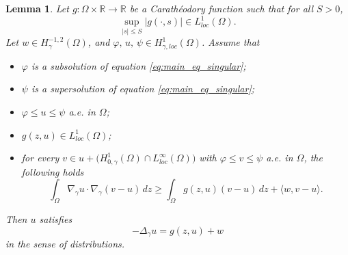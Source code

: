 \documentclass[10pt,a4paper]{amsart}
\newtheorem{lemma}{Lemma}
\newcommand{\gradgr}{\nabla_{\gamma}}
\newcommand{\om} {\Omega}
\newcommand{\spacegr}{H^{1}_{0,\gamma}(\Omega)}
\begin{document}
\begin{lemma}
\label{lem:variational-identity}
Let $g : \Omega \times \mathbb{R} \to \mathbb{R}$ be a Carath\'{e}odory function such that for all $S > 0$,
\begin{equation*}
\sup_{|s|\le S} |g(\cdot,s)| \in L^1_{loc}(\Omega).
\end{equation*}
Let $w \in H^{-1,2}_{\gamma}(\Omega)$, and $\varphi,\, u,\, \psi \in  H^{1}_{\gamma, loc}(\Omega)$. Assume that
\begin{itemize}
\item $\varphi$ is a subsolution of equation \eqref{eq:main_eq_singular};
\item $\psi$ is a supersolution of equation \eqref{eq:main_eq_singular};
\item$\varphi \le u \le \psi$ a.e. in $\om$;
\item$g(z,u) \in L^1_{loc}(\Omega)$;
\item for every $v \in u + \bigl( \spacegr \cap L^\infty_{loc}(\Omega) \bigr)$ with $\varphi \le v \le \psi$ a.e. in $\om$, the following holds
\begin{equation}\label{ineq:min_on_convex}
\int_\Omega
\gradgr u \cdot \gradgr (v-u)\,dz
\ge
\int_\Omega
g(z,u)(v-u)\,dz
+
\langle w , v-u \rangle.
\end{equation}
\end{itemize}
Then $u$ satisfies
\begin{equation*}
- \Delta_{\gamma} u = g(z,u) + w
\end{equation*}
in the sense of distributions. 
\end{lemma}
\end{document}
